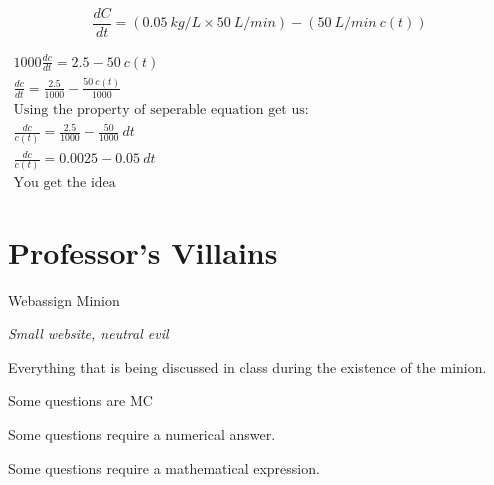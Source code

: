 \documentclass[letterpaper,10pt,twoside,twocolumn,openany]{book}
\begin{document}
$$
    \frac{dC}{dt} = (0.05\ kg/L \times 50\ L/min) - (50\ L/min\ c(t))
$$

$\begin{gathered}
    1000\frac{dc}{dt} = 2.5 - 50\ c(t)\\
    \frac{dc}{dt} = \frac{2.5}{1000} - \frac{50\ c(t)}{1000}\\
    \text{Using the property of seperable equation get us:}\\
    \frac{dc}{c(t)} = \frac{2.5}{1000} - \frac{50}{1000}\ dt\\
    \frac{dc}{c(t)} =  0.0025 - 0.05\ dt\\
    \text{You get the idea}
\end{gathered}$





\chapter{Professor's Villains}
\begin{monsterbox}{Webassign Minion}
    \begin{hangingpar}
        \textit{Small website, neutral evil}
    \end{hangingpar}
    \dndline
    \basics[
        armorclass = Collectively 10,
        hitpoints = \dice{4d10 + 8},
        speed = {1 - 2 weeks}
        ]
        \dndline
        \stats[
        STR = \stat{7},
        DEX = \stat{15},
        CON = \stat{9},
        INT = \stat{8},
        WIS = \stat{7},
        CHA = \stat{8},
    ]
    \dndline
    \details[
        damagevulnerabilities = {Calculator, Wolfram Alpha, Google},
        languages = {Algebra, Integration, Derivative},
        challenge = {1/8},
    ]
    \dndline
    Everything that is being discussed in class during the existence of the minion.
    \begin{monsteraction}
        Some questions are MC
    \end{monsteraction}
    \begin{monsteraction}[Numerical]
        Some questions require a numerical answer.
    \end{monsteraction}    
    \begin{monsteraction}
        Some questions require a mathematical expression.
    \end{monsteraction}
\end{monsterbox}
\end{document}
